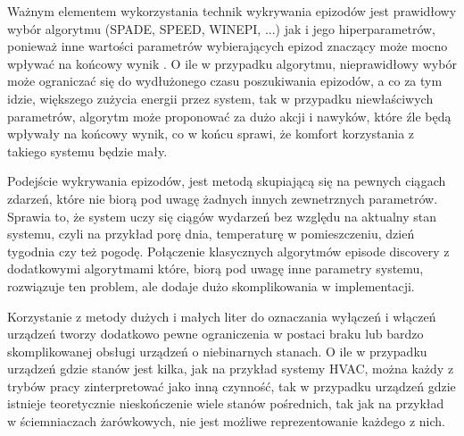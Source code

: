 
Ważnym elementem wykorzystania technik wykrywania epizodów jest prawidłowy wybór algorytmu (SPADE, SPEED, WINEPI, ...) jak i jego hiperparametrów, ponieważ inne wartości parametrów wybierających epizod znaczący może mocno wpływać na końcowy wynik \cite{episode_discovery_2}. O ile w przypadku algorytmu, nieprawidłowy wybór może ograniczać się do wydłużonego czasu poszukiwania epizodów, a co za tym idzie, większego zużycia energii przez system, tak w przypadku niewłaściwych parametrów, algorytm może proponować za dużo akcji i nawyków, które źle będą wpływały na końcowy wynik, co w końcu sprawi, że komfort korzystania z takiego systemu będzie mały.

Podejście wykrywania epizodów, jest metodą skupiającą się na pewnych ciągach zdarzeń, które nie biorą pod uwagę żadnych innych zewnetrznych parametrów. Sprawia to, że system uczy się ciągów wydarzeń bez względu na aktualny stan systemu, czyli na przykład porę dnia, temperaturę w pomieszczeniu, dzień tygodnia czy też pogodę. Połączenie klasycznych algorytmów episode discovery z dodatkowymi algorytmami które, biorą pod uwagę inne parametry systemu, rozwiązuje ten problem, ale dodaje dużo skomplikowania w implementacji.

Korzystanie z metody dużych i małych liter do oznaczania wyłączeń i włączeń urządzeń tworzy dodatkowo pewne ograniczenia w postaci braku lub bardzo skomplikowanej obsługi urządzeń o niebinarnych stanach. O ile w przypadku urządzeń gdzie stanów jest kilka, jak na przykład systemy HVAC, można każdy z trybów pracy zinterpretować jako inną czynność, tak w przypadku urządzeń gdzie istnieje teoretycznie nieskończenie wiele stanów pośrednich, tak jak na przykład w ściemniaczach żarówkowych, nie jest możliwe reprezentowanie każdego z nich.


